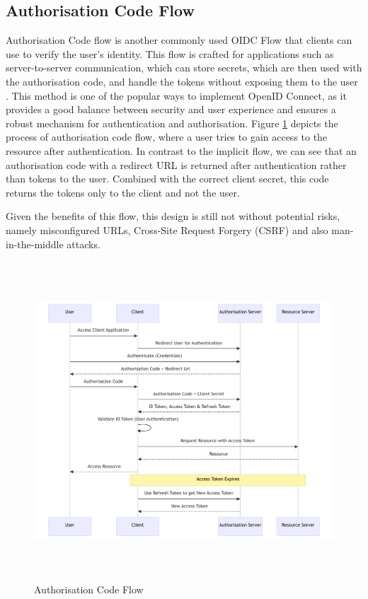 \subsection{Authorisation Code Flow}
Authorisation Code flow is another commonly used OIDC Flow that clients can use to verify the user's identity.
This flow is crafted for applications such as server-to-server communication, which can store secrets, which are then used with the authorisation code, and handle the tokens without exposing them to the user \citep{auth_flow_oidc}.
This method is one of the popular ways to implement OpenID Connect, as it provides a good balance between security and user experience and ensures a robust mechanism for authentication and authorisation.
Figure \ref{fig:authorisation_flow} depicts the process of authorisation code flow, where a user tries to gain access to the resource after authentication.
In contrast to the implicit flow, we can see that an authorisation code with a redirect URL is returned after authentication rather than tokens to the user.
Combined with the correct client secret, this code returns the tokens only to the client and not the user. 

Given the benefits of this flow, this design is still not without potential risks, namely misconfigured URLs, Cross-Site Request Forgery (CSRF) and also man-in-the-middle attacks. 

\begin{figure}[h!]
\centering
\includegraphics[width=\textwidth, height=450px]{pics/authorization_code.pdf}
\caption{Authorisation Code Flow}
\label{fig:authorisation_flow}
\end{figure}

